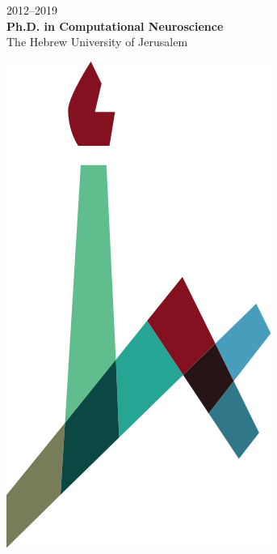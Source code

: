 \documentclass[t,xcolor={svgnames,table}]{beamer}
\begin{document}
\begin{frame}
\vfill\pause

\begin{minipage}{.7\textwidth}
2012--2019 \\
\textbf{Ph.D. in Computational Neuroscience} \\
The Hebrew University of Jerusalem
\end{minipage}
\begin{minipage}{.1\textwidth}
\includegraphics[width=\textwidth]{Hebrew_University_new_Logo_2.png}
\end{minipage}
\end{frame}
\end{document}
